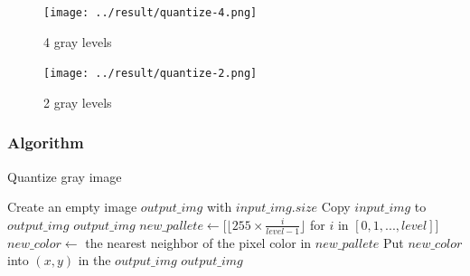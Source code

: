 \documentclass{article}
\begin{document}
\begin{figure}[H]
\centering
\texttt{[image: ../result/quantize-4.png]}
\caption{4 gray levels}
\label{quan4}
\end{figure}

\begin{figure}[H]
\centering
\texttt{[image: ../result/quantize-2.png]}
\caption{2 gray levels}
\label{quan2}
\end{figure}

\subsubsection{Algorithm}
\label{sec:quanalgo}
\begin{algorithm}[h]
\centering
\caption{Quantize gray image}
\label{alg:quan}
  \begin{algorithmic}[1]
      \State Create an empty image $output\_img$ with $input\_img.size$
      	\State Copy $input\_img$ to $output\_img$
      	\State \Return $output\_img$
      \EndIf
      \State $new\_pallete \gets [\lfloor255 \times \frac{i}{level-1}\rfloor$ for $i$ in $[0, 1, ..., level]$]
      	\State $new\_color \gets$ the nearest neighbor of the pixel color in $new\_pallete$
      	\State Put $new\_color$ into $(x, y)$ in the $output\_img$
      \EndFor
      \State \Return $output\_img$
    \EndFunction
  \end{algorithmic}
\end{algorithm}


\fi

\end{document}
